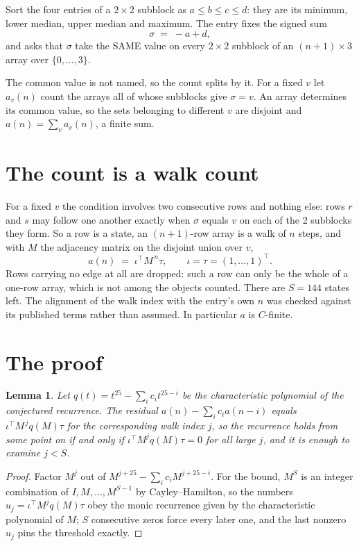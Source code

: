 \documentclass[11pt,a4paper]{article}
\theoremstyle{plain}
\newtheorem{lemma}[theorem]{Lemma}
\theoremstyle{definition}
\begin{document}
Sort the four entries of a $2\times2$ subblock as $a\le b\le c\le d$: they
are its minimum, lower median, upper median and maximum. The entry fixes the signed sum
\[
\sigma\;=\;-a+d,
\]
and asks that $\sigma$ take the SAME value on every $2\times2$ subblock of an
$(n+1)\times3$ array over $\{0,\dots,3\}$.

The common value is not named, so the count splits by it. For a fixed $v$ let $a_v(n)$ count
the arrays all of whose subblocks give $\sigma=v$. An array determines its common value, so
the sets belonging to different $v$ are disjoint and $a(n)=\sum_v a_v(n)$, a finite sum.


\section{The count is a walk count}

For a fixed $v$ the condition involves two consecutive rows and nothing
else: rows $r$ and $s$ may follow one another exactly when $\sigma$ equals $v$ on each of the
$2$ subblocks they form. So a row is a state, an $(n+1)$-row array is a walk of $n$
steps, and with $M$ the adjacency matrix on the disjoint union over $v$,
\[
a(n)\;=\;\iota^{\!\top}M^{\,n}\tau,\qquad\iota=\tau=(1,\dots,1)^{\!\top} .
\]
Rows carrying no edge at all are dropped: such a row can only be the whole of a one-row
array, which is not among the objects counted. There are $S=144$ states left.
The alignment of the walk index with the entry's own $n$ was checked against its published
terms rather than assumed. In particular $a$ is $C$-finite.

\section{The proof}

\begin{lemma}\label{lem:crit}
Let $q(t)=t^{25}-\sum_i c_it^{25-i}$ be the characteristic polynomial of the
conjectured recurrence. The residual $a(n)-\sum_ic_ia(n-i)$ equals
$\iota^{\!\top}M^{\,j}q(M)\tau$ for the corresponding walk index $j$, so the recurrence
holds from some point on if and only if $\iota^{\!\top}M^{j}q(M)\tau=0$ for all large $j$,
and it is enough to examine $j<S$.
\end{lemma}

\begin{proof}
Factor $M^{j}$ out of $M^{j+25}-\sum_ic_iM^{j+25-i}$. For the bound, $M^{S}$
is an integer combination of $I,M,\dots,M^{S-1}$ by Cayley--Hamilton, so the numbers
$u_j=\iota^{\!\top}M^{j}q(M)\tau$ obey the monic recurrence given by the characteristic
polynomial of $M$; $S$ consecutive zeros force every later one, and the last nonzero $u_j$
pins the threshold exactly.
\end{proof}
\end{document}
